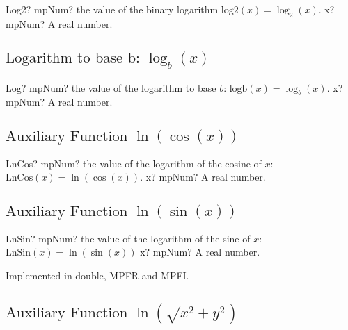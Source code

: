 \begin{mpFunctionsExtract}
	\mpFunctionOne
	{Log2? mpNum? the value of the binary logarithm $\text{log2}(x) = \log_{2}(x)$.}
	{x? mpNum? A real number.}
\end{mpFunctionsExtract}





\subsection{\texorpdfstring{$\text{Logarithm to base b: }\log_b(x)$}{logb}}

\begin{mpFunctionsExtract}
	\mpFunctionOne
	{Log? mpNum? the value of the logarithm  to base $b$: $\text{logb}(x) = \log_{b}(x)$.}
	{x? mpNum? A real number.}
\end{mpFunctionsExtract}





\subsection{\texorpdfstring{$\text{Auxiliary Function }\ln(\cos(x))$}{LnCos}}

\begin{mpFunctionsExtract}
	\mpFunctionOne
	{LnCos? mpNum? the value of the logarithm of the cosine of $x$: $\text{LnCos}(x) =\ln(\cos(x))$.}
	{x? mpNum? A real number.}
\end{mpFunctionsExtract}




\subsection{\texorpdfstring{$\text{Auxiliary Function }\ln(\sin(x))$}{LnSin}}

\begin{mpFunctionsExtract}
	\mpFunctionOne
	{LnSin? mpNum? the value of the logarithm of the sine of $x$: $\text{LnSin}(x) =\ln(\sin(x))$}
	{x? mpNum? A real number.}
\end{mpFunctionsExtract}



Implemented in double, MPFR and MPFI.


\subsection{\texorpdfstring{$\text{Auxiliary Function }\ln \left(\sqrt{x^2+y^2} \right)$}{LnSqrtx2y2}}

